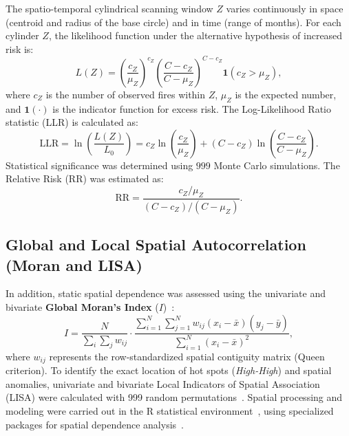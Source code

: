 \documentclass[preprint,12pt,authoryear]{elsarticle}
\begin{document}
	The spatio-temporal cylindrical scanning window $Z$ varies
	continuously in space (centroid and radius of the base circle) and
	in time (range of months). For each cylinder $Z$, the likelihood
	function under the alternative hypothesis of increased risk is:
	\begin{equation}
		L(Z) = \left(\frac{c_Z}{\mu_Z}\right)^{c_Z}
		\left(\frac{C - c_Z}{C - \mu_Z}\right)^{C - c_Z}
		\mathbf{1}(c_Z > \mu_Z),
		\label{eq:verosimilitud}
	\end{equation}
	where $c_Z$ is the number of observed fires within $Z$, $\mu_Z$ is
	the expected number, and $\mathbf{1}(\cdot)$ is the indicator
	function for excess risk. The Log-Likelihood Ratio statistic (LLR)
	is calculated as:
	\begin{equation}
		\text{LLR} = \ln\!\left(\frac{L(Z)}{L_0}\right)
		= c_Z \ln\!\left(\frac{c_Z}{\mu_Z}\right)
		+ (C-c_Z)\ln\!\left(\frac{C-c_Z}{C-\mu_Z}\right).
		\label{eq:llr}
	\end{equation}
	Statistical significance was determined using $999$ Monte Carlo
	simulations. The Relative Risk (RR) was estimated as:
	\begin{equation}
		\text{RR} = \frac{c_Z / \mu_Z}{(C - c_Z) / (C - \mu_Z)}.
		\label{eq:rr}
	\end{equation}
	
	\subsection{Global and Local Spatial Autocorrelation (Moran and LISA)}
	
	In addition, static spatial dependence was assessed using the
	univariate and bivariate \textbf{Global Moran's Index}
	($I$)~\citep{Anselin1995}:
	\begin{equation}
		I = \frac{N}{\displaystyle\sum_{i}\sum_{j} w_{ij}}
		\cdot
		\frac{\displaystyle\sum_{i=1}^{N}\sum_{j=1}^{N}
			w_{ij}(x_i - \bar{x})(y_j - \bar{y})}
		{\displaystyle\sum_{i=1}^{N}(x_i - \bar{x})^2},
		\label{eq:moran}
	\end{equation}
	where $w_{ij}$ represents the row-standardized spatial contiguity
	matrix (Queen criterion). To identify the exact location of hot
	spots (\textit{High-High}) and spatial anomalies, univariate and
	bivariate Local Indicators of Spatial Association (LISA) were
	calculated with 999 random permutations~\citep{Kumari2025,Mupfiga2022,MemisogluBaykal2025}.
	Spatial processing and modeling were carried out in the R
	statistical environment~\citep{RCoreTeam2024}, using specialized
	packages for spatial dependence analysis~\citep{Bivand2013,Bivand2018}.
	
\end{document}

